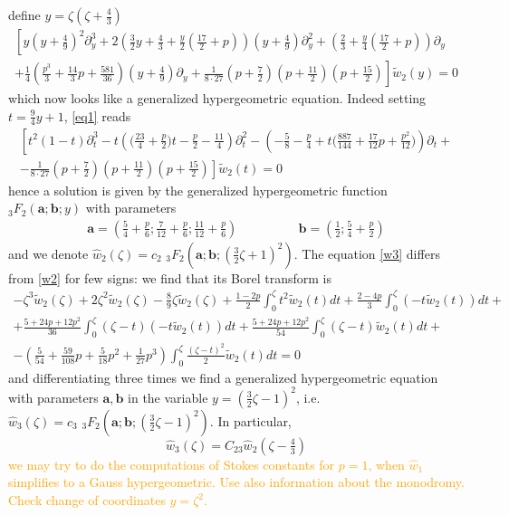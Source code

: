 \documentclass{article}
\theoremstyle{definition}
\begin{document}
define $y=\zeta\left(\zeta+\frac{4}{3}\right)$
\begin{multline}\label{eq1}
\left[y\left(y+\frac{4}{9}\right)^2\partial_y^3+2\left(\frac{3}{2}y+\frac{4}{3}+\frac{y}{2}\left(\frac{17}{2}+p\right)\right)\left(y+\frac{4}{9}\right)\partial_y^2+\left(\frac{2}{3}+\frac{y}{4}\left(\frac{17}{2}+p\right)\right)\partial_y\right.\\
\left.+\frac{1}{4}\left(\frac{p^3}{3}+\frac{14}{3}p+\frac{581}{36}\right)\left(y+\frac{4}{9}\right)\partial_y+\frac{1}{8\cdot 27}\left(p+\frac{7}{2}\right)\left(p+\frac{11}{2}\right)\left(p+\frac{15}{2}\right)\right]\tilde{w}_2(y)=0
\end{multline}
which now looks like a generalized hypergeometric equation. Indeed setting $t=\tfrac{9}{4}y+1$, \eqref{eq1} reads
\begin{multline}
\left[t^2(1-t)\partial_t^3-t\left(\big(\frac{23}{4}+\frac{p}{2}\big)t-\frac{p}{2}-\frac{11}{4}\right)\partial_t^2-\left(-\frac{5}{8}-\frac{p}{4}+t\Big(\frac{887}{144}+\frac{17}{12}p+\frac{p^2}{12}\Big)\right)\partial_t +\right.\\
\left. -\frac{1}{8\cdot 27}\left(p+\frac{7}{2}\right)\left(p+\frac{11}{2}\right)\left(p+\frac{15}{2}\right)\right]\tilde{w}_2(t)=0
\end{multline}
hence a solution is given by the generalized hypergeometric function ${}_3F_2\left(\mathbf{a};\mathbf{b};y\right)$ with parameters
\begin{align*}
\mathbf{a}=\left(\frac{5}{4}+\frac{p}{6};\frac{7}{12}+\frac{p}{6};\frac{11}{12}+\frac{p}{6}\right) & \qquad\qquad \mathbf{b}=\left(\frac{1}{2};\frac{5}{4}+\frac{p}{2}\right)
\end{align*}
and we denote $\hat{w}_2(\zeta)=c_2\,\, {}_3F_2\left(\mathbf{a};\mathbf{b};\left(\tfrac{3}{2}\zeta+1\right)^2\right)$. The equation \eqref{w3} differs from \eqref{w2} for few signs: we find that its Borel transform is 
\begin{multline}
-\zeta^3\tilde{w}_2(\zeta)+2\zeta^2\tilde{w}_2(\zeta)-\frac{8}{9}\zeta\tilde{w}_2(\zeta)+\frac{1-2p}{2}\int_0^\zeta t^2\tilde{w}_2(t)dt+\frac{2-4p}{3}\int_0^\zeta(-t\tilde{w}_2(t))dt+\\
+\frac{5+24p+12p^2}{36}\int_0^\zeta(\zeta-t)(-t\tilde{w}_2(t))dt
+\frac{5+24p+12p^2}{54}\int_0^\zeta(\zeta-t)\tilde{w}_2(t)dt +\\
-\left(\frac{5}{54}+\frac{59}{108}p+\frac{5}{18}p^2+\frac{1}{27}p^3\right)\int_0^\zeta\frac{(\zeta-t)^2}{2}\tilde{w}_2(t)dt=0
\end{multline}
and differentiating three times we find a generalized hypergeometric equation with parameters $\mathbf{a},\mathbf{b}$ in the variable $y=\left(\tfrac{3}{2}\zeta-1\right)^2$, i.e. $\hat{w}_3(\zeta)= c_3\,\, {}_3F_2\left(\mathbf{a};\mathbf{b};\left(\tfrac{3}{2}\zeta-1\right)^2\right)$. In particular, 
\begin{equation}
\hat{w}_3(\zeta)=C_{23}\hat{w}_2(\zeta-\tfrac{4}{3})
\end{equation}
\textcolor{orange}{we may try to do the computations of Stokes constants for $p=1$, when $\hat{w}_1$ simplifies to a Gauss hypergeometric. Use also information about the monodromy. Check change of coordinates $y=\zeta^2$.}
\end{document}
